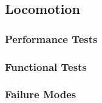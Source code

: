 
\subsection{Locomotion}
\label{sec:verification_locomotion}

\subsubsection{Performance Tests}
\label{sec:locomotion_pt}

\subsubsection{Functional Tests}
\label{sec:locomotion_ft}

\subsubsection{Failure Modes}
\label{sec:locomotion_fm}